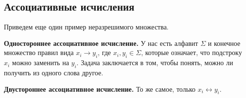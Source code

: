 \vspace{5mm}

\subsection{Ассоциативные исчисления}

Приведем еще один пример неразрешимого множества. 

\textbf{Одностороннее ассоциативное исчисление.} У нас есть алфавит $\Sigma$ и конечное множество правил вида $x_i \to y_i$, где $x_i, y_i \in \Sigma$, которые означает, что подстроку $x_i$ можно заменить на $y_i$. Задача заключается в том, чтобы понять, можно ли получить из одного слова другое. 

\textbf{Двустороннее ассоциативное исчисление.} То же самое, только $x_i \leftrightarrow y_i$.

